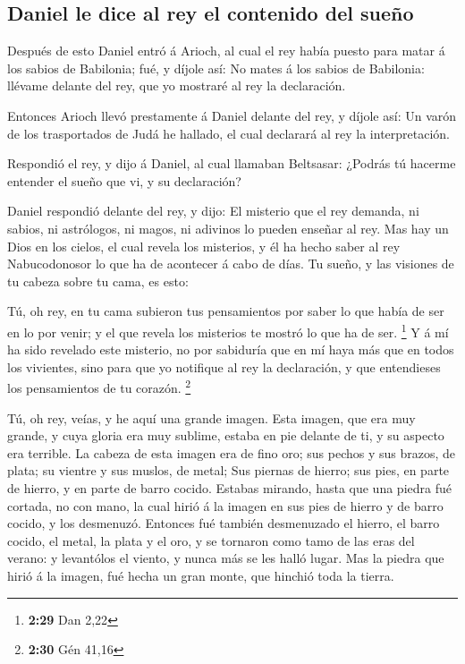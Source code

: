 \hypertarget{daniel-le-dice-al-rey-el-contenido-del-sueuxf1o}{%
\subsection{Daniel le dice al rey el contenido del
sueño}\label{daniel-le-dice-al-rey-el-contenido-del-sueuxf1o}}

 Después de esto Daniel entró á Arioch, al cual el rey
había puesto para matar á los sabios de Babilonia; fué, y díjole así: No
mates á los sabios de Babilonia: llévame delante del rey, que yo
mostraré al rey la declaración.

 Entonces Arioch llevó prestamente á Daniel delante del
rey, y díjole así: Un varón de los trasportados de Judá he hallado, el
cual declarará al rey la interpretación.

 Respondió el rey, y dijo á Daniel, al cual llamaban
Beltsasar: ¿Podrás tú hacerme entender el sueño que vi, y su
declaración?

 Daniel respondió delante del rey, y dijo: El misterio que
el rey demanda, ni sabios, ni astrólogos, ni magos, ni adivinos lo
pueden enseñar al rey.  Mas hay un Dios en los cielos, el
cual revela los misterios, y él ha hecho saber al rey Nabucodonosor lo
que ha de acontecer á cabo de días. Tu sueño, y las visiones de tu
cabeza sobre tu cama, es esto:

 Tú, oh rey, en tu cama subieron tus pensamientos por saber
lo que había de ser en lo por venir; y el que revela los misterios te
mostró lo que ha de ser. \footnote{\textbf{2:29} Dan 2,22} 
Y á mí ha sido revelado este misterio, no por sabiduría que en mí haya
más que en todos los vivientes, sino para que yo notifique al rey la
declaración, y que entendieses los pensamientos de tu corazón.
\footnote{\textbf{2:30} Gén 41,16}

 Tú, oh rey, veías, y he aquí una grande imagen. Esta
imagen, que era muy grande, y cuya gloria era muy sublime, estaba en pie
delante de ti, y su aspecto era terrible.  La cabeza de
esta imagen era de fino oro; sus pechos y sus brazos, de plata; su
vientre y sus muslos, de metal;  Sus piernas de hierro; sus
pies, en parte de hierro, y en parte de barro cocido. 
Estabas mirando, hasta que una piedra fué cortada, no con mano, la cual
hirió á la imagen en sus pies de hierro y de barro cocido, y los
desmenuzó.  Entonces fué también desmenuzado el hierro, el
barro cocido, el metal, la plata y el oro, y se tornaron como tamo de
las eras del verano: y levantólos el viento, y nunca más se les halló
lugar. Mas la piedra que hirió á la imagen, fué hecha un gran monte, que
hinchió toda la tierra.

